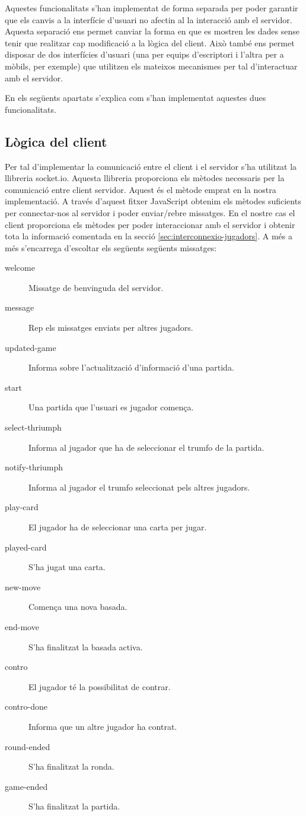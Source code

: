 Aquestes funcionalitats s'han implementat de forma separada per poder garantir que els canvis a la interfície d'usuari no afectin al la interacció amb el servidor. Aquesta separació ens permet canviar la forma en que es mostren les dades sense tenir que realitzar cap modificació a la lògica del client. Això també ens permet disposar de dos interfícies d'usuari (una per equips d'escriptori i l'altra per a mòbils, per exemple) que utilitzen els mateixos mecanismes per tal d'interactuar amb el servidor. 

En els següents apartats s'explica com s'han implementat aquestes dues funcionalitats. 

\subsection{Lògica del client}

Per tal d'implementar la comunicació entre el client i el servidor s'ha utilitzat la llibreria socket.io. Aquesta llibreria proporciona els mètodes necessaris per la comunicació entre client servidor. Aquest és el mètode emprat en la nostra implementació. A través d'aquest fitxer JavaScript obtenim els mètodes suficients per connectar-nos al servidor i poder enviar/rebre missatges. En el nostre cas el client proporciona els mètodes per poder interaccionar amb el servidor i obtenir tota la informació comentada en la secció \ref{sec:interconnexio-jugadors}. A més a més s'encarrega d'escoltar els següents següents missatges: 

\begin{description}
\item[welcome]{Missatge de benvinguda del servidor.}
\item[message]{Rep els missatges enviats per altres jugadors.}
\item[updated-game]{Informa sobre l'actualització d'informació d'una partida. }
\item[start]{Una partida que l'usuari es jugador comença.}
\item[select-thriumph]{Informa al jugador que ha de seleccionar el trumfo de la partida. }
\item[notify-thriumph]{Informa al jugador el trumfo seleccionat pels altres jugadors.}
\item[play-card]{El jugador ha de seleccionar una carta per jugar. }
\item[played-card]{S'ha jugat una carta.}
\item[new-move]{Comença una nova basada.}
\item[end-move]{S'ha finalitzat la basada activa.}
\item[contro]{El jugador té la possibilitat de contrar.}
\item[contro-done]{Informa que un altre jugador ha contrat.}
\item[round-ended]{S'ha finalitzat la ronda.}
\item[game-ended]{S'ha finalitzat la partida.}
\end{description}

